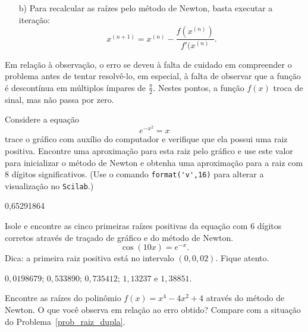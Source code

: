 \begin{resp}
\begin{itemize}

\item[b)] Para recalcular as raízes pelo método de Newton, basta executar a iteração:
\begin{equation} x^{(n+1)}=x^{(n)}-\frac{f(x^{(n)})}{f'(x^{(n)}}. \end{equation}
\end{itemize}
Em relação à observação, o erro se deveu à falta de cuidado em compreender o problema antes de tentar resolvê-lo, em especial, à falta de observar que a função é descontínua em  múltiplos ímpares de $\frac{\pi}{2}$. Nestes pontos, a função $f(x)$ troca de sinal, mas não passa por zero.
\end{resp}
\fi


\begin{exer}\label{new1} Considere a equação
  \begin{equation} e^{-x^2}=x \end{equation}
trace o gráfico com auxílio do computador e verifique que ela possui uma raiz positiva. Encontre uma aproximação para esta raiz pelo gráfico e use este valor para inicializar o método de Newton e obtenha uma aproximação para a raiz com 8 dígitos significativos. \ifisscilab (Use o comando \verb+format('v',16)+ para alterar a visualização no \verb+Scilab+.)\fi
\end{exer}
\begin{resp}
  0,65291864
  \end{resp}

\begin{exer}\label{new2} Isole e encontre as cinco primeiras raízes positivas da equação com 6 dígitos corretos através de traçado de gráfico e do método de Newton.
\begin{equation} \cos(10x)=e^{-x}. \end{equation} Dica: a primeira raiz positiva está no intervalo $(0, 0,02)$. Fique atento.
\end{exer}
\begin{resp}
   $0,0198679$; $0,533890$; $0,735412$; $1,13237$ e $1,38851$.
  \end{resp}


\begin{exer}\label{new3} Encontre as raízes do polinômio $f(x)=x^4-4x^2+4$ através do método de Newton. O que você observa em relação ao erro obtido? Compare com a situação do Problema~\ref{prob_raiz_dupla}.
\end{exer}


